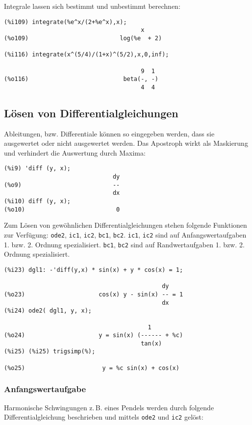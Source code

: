 \documentclass[12pt]{scrartcl}
\newcommand*\zB{z.\,B.\xspace}
\begin{document}
Integrale lassen sich bestimmt und unbestimmt berechnen:

\begin{verbatim}
(%i109) integrate(%e^x/(2+%e^x),x);
                                       x
(%o109)                          log(%e  + 2)

(%i116) integrate(x^(5/4)/(1+x)^(5/2),x,0,inf);

                                       9  1
(%o116)                           beta(-, -)
                                       4  4
\end{verbatim}

\subsection{Lösen von Differentialgleichungen}

Ableitungen, bzw. Differentiale können so eingegeben werden, dass sie
ausgewertet oder nicht ausgewertet werden.  Das Apostroph wirkt als
Maskierung und verhindert die Auswertung durch Maxima:

\begin{verbatim}
(%i9) 'diff (y, x);
                               dy
(%o9)                          --
                               dx
(%i10) diff (y, x);
(%o10)                          0
\end{verbatim}

Zum Lösen von gewöhnlichen Differentialgleichungen stehen folgende
Funktionen zur Verfügung: \texttt{ode2}, \texttt{ic1}, \texttt{ic2}, \texttt{bc1}, \texttt{bc2}.
\texttt{ic1}, \texttt{ic2} sind auf Anfangswertaufgaben 1. bzw. 2. Ordnung spezialisiert.
\texttt{bc1}, \texttt{bc2} sind auf Randwertaufgaben 1. bzw. 2. Ordnung spezialisiert.

\begin{verbatim}
(%i23) dgl1: -'diff(y,x) * sin(x) + y * cos(x) = 1;

                                             dy
(%o23)                     cos(x) y - sin(x) -- = 1
                                             dx
(%i24) ode2( dgl1, y, x);

                                         1
(%o24)                     y = sin(x) (------ + %c)
                                       tan(x)
(%i25) (%i25) trigsimp(%);

(%o25)                      y = %c sin(x) + cos(x)
\end{verbatim}

\subsubsection*{Anfangswertaufgabe}
Harmonische Schwingungen \zB eines Pendels
werden durch folgende Differentialgleichung beschrieben und mittels
\texttt{ode2} und \texttt{ic2} gelöst:
\end{document}
